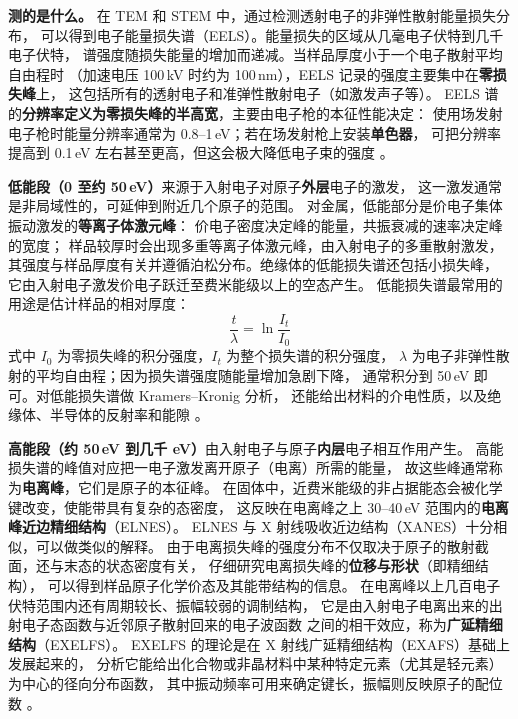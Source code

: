 \begin{principle}
\textbf{测的是什么。} 在 TEM 和 STEM 中，通过检测透射电子的非弹性散射能量损失分布，
可以得到电子能量损失谱（EELS）。能量损失的区域从几毫电子伏特到几千电子伏特，
谱强度随损失能量的增加而递减。当样品厚度小于一个电子散射平均自由程时
（加速电压 100\,kV 时约为 100\,nm），EELS 记录的强度主要集中在\textbf{零损失峰}上，
这包括所有的透射电子和准弹性散射电子（如激发声子等）。
EELS 谱的\textbf{分辨率定义为零损失峰的半高宽}，主要由电子枪的本征性能决定：
使用场发射电子枪时能量分辨率通常为 0.8--1\,eV；若在场发射枪上安装\textbf{单色器}，
可把分辨率提高到 0.1\,eV 左右甚至更高，但这会极大降低电子束的强度
。

\textbf{低能段（0 至约 50\,eV）}来源于入射电子对原子\textbf{外层}电子的激发，
这一激发通常是非局域性的，可延伸到附近几个原子的范围。
对金属，低能部分是价电子集体振动激发的\textbf{等离子体激元峰}：
价电子密度决定峰的能量，共振衰减的速率决定峰的宽度；
样品较厚时会出现多重等离子体激元峰，由入射电子的多重散射激发，
其强度与样品厚度有关并遵循泊松分布。绝缘体的低能损失谱还包括小损失峰，
它由入射电子激发价电子跃迁至费米能级以上的空态产生。
低能损失谱最常用的用途是估计样品的相对厚度：
\begin{equation}
\frac{t}{\lambda}=\ln\frac{I_t}{I_0}
\label{eq:ch02b-thickness}
\end{equation}
式中 $I_0$ 为零损失峰的积分强度，$I_t$ 为整个损失谱的积分强度，
$\lambda$ 为电子非弹性散射的平均自由程；因为损失谱强度随能量增加急剧下降，
通常积分到 50\,eV 即可。对低能损失谱做 Kramers--Kronig 分析，
还能给出材料的介电性质，以及绝缘体、半导体的反射率和能隙
。

\textbf{高能段（约 50\,eV 到几千 eV）}由入射电子与原子\textbf{内层}电子相互作用产生。
高能损失谱的峰值对应把一电子激发离开原子（电离）所需的能量，
故这些峰通常称为\textbf{电离峰}，它们是原子的本征峰。
在固体中，近费米能级的非占据能态会被化学键改变，使能带具有复杂的态密度，
这反映在电离峰之上 30--40\,eV 范围内的\textbf{电离峰近边精细结构}（ELNES）。
ELNES 与 X 射线吸收近边结构（XANES）十分相似，可以做类似的解释。
由于电离损失峰的强度分布不仅取决于原子的散射截面，还与末态的状态密度有关，
仔细研究电离损失峰的\textbf{位移与形状}（即精细结构），
可以得到样品原子化学价态及其能带结构的信息。
在电离峰以上几百电子伏特范围内还有周期较长、振幅较弱的调制结构，
它是由入射电子电离出来的出射电子态函数与近邻原子散射回来的电子波函数
之间的相干效应，称为\textbf{广延精细结构}（EXELFS）。
EXELFS 的理论是在 X 射线广延精细结构（EXAFS）基础上发展起来的，
分析它能给出化合物或非晶材料中某种特定元素（尤其是轻元素）为中心的径向分布函数，
其中振动频率可用来确定键长，振幅则反映原子的配位数
。


\end{principle}
